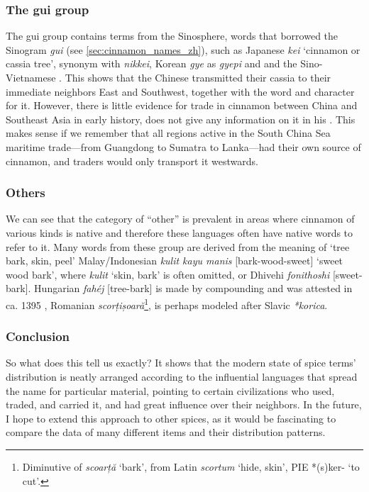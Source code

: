 \subsubsection{The gui group}

The gui group contains terms from the Sinosphere, words that borrowed the Sinogram  \textit{gui} (see \cref{sec:cinnamon_names_zh}), such as Japanese  \textit{kei} `cinnamon or cassia tree', synonym with  \textit{nikkei}, Korean  \textit{gye} as  \textit{gyepi} and  and the Sino-Vietnamese . This shows that the Chinese transmitted their cassia to their immediate neighbors East and Southwest, together with the word and character for it. However, there is little evidence for trade in cinnamon between China and Southeast Asia in early history, \textcite{wang_nanhai_1958} does not give any information on it in his . \autocite{wang_nanhai_1958} This makes sense if we remember that all regions active in the South China Sea maritime trade---from Guangdong to Sumatra to Lanka---had their own source of cinnamon, and traders would only transport it westwards.

\subsubsection{Others}

We can see that the category of ``other'' is prevalent in areas where cinnamon of various kinds is native and therefore these languages often have native words to refer to it. Many words from these group are derived from the meaning of `tree bark, skin, peel' Malay/Indonesian \textit{kulit kayu manis} [bark-wood-sweet] `sweet wood bark', where \textit{kulit} `skin, bark' is often omitted, or Dhivehi \textit{fonithoshi} [sweet-bark]. Hungarian \textit{fahéj} [tree-bark] is made by compounding and was attested in ca. 1395 \autocite[fahéj]{zaicz_etimologiai_2006}, Romanian \textit{scorțișoară}\footnote{Diminutive of \textit{scoarță} `bark', from Latin \textit{scortum} `hide, skin', \gls{PIE} *(s)ker- `to cut'.}, is perhaps modeled after Slavic \textit{*korica}.

\subsubsection{Conclusion}

So what does this tell us exactly? It shows that the modern state of spice terms' distribution is neatly arranged according to the influential languages that spread the name for particular material, pointing to certain civilizations who used, traded, and carried it, and had great influence over their neighbors. In the future, I hope to extend this approach to other spices, as it would be fascinating to compare the data of many different items and their distribution patterns.

















